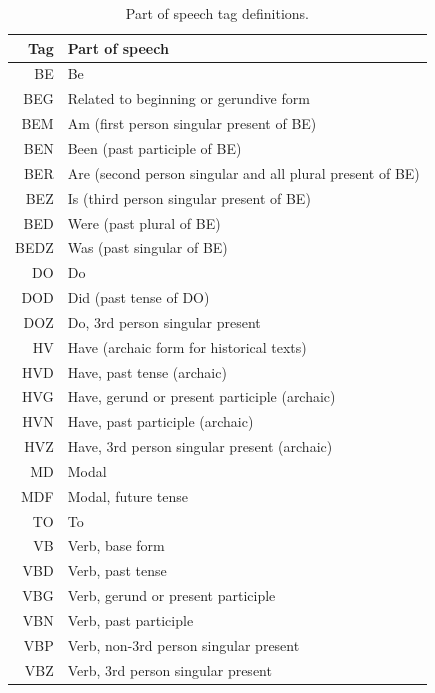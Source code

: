 \documentclass[10pt]{article}
\begin{document}
\begin{table}[h!]
    \centering
    \caption{Part of speech tag definitions.}
    \begin{tabular}{r|l}
        \toprule
        \textbf{Tag} & \textbf{Part of speech} \\
        \midrule
        BE & Be \\
        \midrule
        BEG & Related to beginning or gerundive form \\
        \midrule
        BEM & Am (first person singular present of BE) \\
        \midrule
        BEN & Been (past participle of BE) \\
        \midrule
        BER & Are (second person singular and all plural present of BE) \\
        \midrule
        BEZ & Is (third person singular present of BE) \\
        \midrule
        BED & Were (past plural of BE) \\
        \midrule
        BEDZ & Was (past singular of BE) \\
        \midrule
        DO & Do \\
        \midrule
        DOD & Did (past tense of DO) \\
        \midrule
        DOZ & Do, 3rd person singular present \\
        \midrule
        HV & Have (archaic form for historical texts) \\
        \midrule
        HVD & Have, past tense (archaic) \\
        \midrule
        HVG & Have, gerund or present participle (archaic) \\
        \midrule
        HVN & Have, past participle (archaic) \\
        \midrule
        HVZ & Have, 3rd person singular present (archaic) \\
        \midrule
        MD & Modal \\
        \midrule
        MDF & Modal, future tense \\
        \midrule
        TO & To \\
        \midrule
        VB & Verb, base form \\
        \midrule
        VBD & Verb, past tense \\
        \midrule
        VBG & Verb, gerund or present participle \\
        \midrule
        VBN & Verb, past participle \\
        \midrule
        VBP & Verb, non-3rd person singular present \\
        \midrule
        VBZ & Verb, 3rd person singular present \\
        \bottomrule
    \end{tabular}
    \label{tab:pos_tags}
  \end{table}
\end{document}
